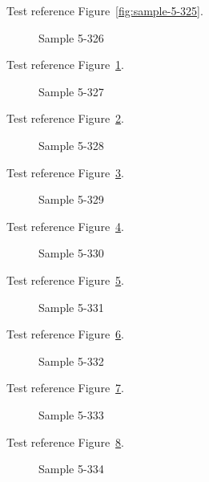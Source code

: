 Test reference Figure~\ref{fig:sample-5-325}.

\begin{figure}[tbhp]
\caption{Sample 5-326}
\label{fig:sample-5-326}
\end{figure}

Test reference Figure~\ref{fig:sample-5-326}.

\begin{figure}[tbhp]
\caption{Sample 5-327}
\label{fig:sample-5-327}
\end{figure}

Test reference Figure~\ref{fig:sample-5-327}.

\begin{figure}[tbhp]
\caption{Sample 5-328}
\label{fig:sample-5-328}
\end{figure}

Test reference Figure~\ref{fig:sample-5-328}.

\begin{figure}[tbhp]
\caption{Sample 5-329}
\label{fig:sample-5-329}
\end{figure}

Test reference Figure~\ref{fig:sample-5-329}.

\begin{figure}[tbhp]
\caption{Sample 5-330}
\label{fig:sample-5-330}
\end{figure}

Test reference Figure~\ref{fig:sample-5-330}.

\begin{figure}[tbhp]
\caption{Sample 5-331}
\label{fig:sample-5-331}
\end{figure}

Test reference Figure~\ref{fig:sample-5-331}.

\begin{figure}[tbhp]
\caption{Sample 5-332}
\label{fig:sample-5-332}
\end{figure}

Test reference Figure~\ref{fig:sample-5-332}.

\begin{figure}[tbhp]
\caption{Sample 5-333}
\label{fig:sample-5-333}
\end{figure}

Test reference Figure~\ref{fig:sample-5-333}.

\begin{figure}[tbhp]
\caption{Sample 5-334}
\label{fig:sample-5-334}
\end{figure}

